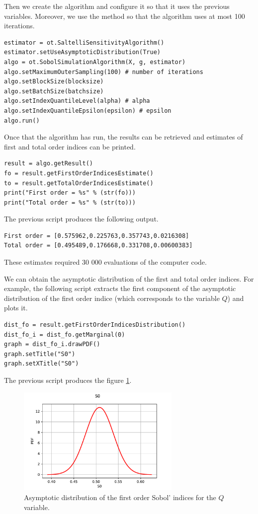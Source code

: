 \documentclass{uncecomp2019}
\begin{document}
Then we create the algorithm and configure it so that it 
uses the previous variables. 
Moreover, we use the  method so that 
the algorithm uses at most 100 iterations. 
\begin{lstlisting}
estimator = ot.SaltelliSensitivityAlgorithm()
estimator.setUseAsymptoticDistribution(True)
algo = ot.SobolSimulationAlgorithm(X, g, estimator)
algo.setMaximumOuterSampling(100) # number of iterations
algo.setBlockSize(blocksize) 
algo.setBatchSize(batchsize) 
algo.setIndexQuantileLevel(alpha) # alpha
algo.setIndexQuantileEpsilon(epsilon) # epsilon
algo.run()
\end{lstlisting}

Once that the algorithm has run, the results can be retrieved and estimates 
of first and total order indices can be printed. 
\begin{lstlisting}
result = algo.getResult()
fo = result.getFirstOrderIndicesEstimate()
to = result.getTotalOrderIndicesEstimate()
print("First order = %s" % (str(fo)))
print("Total order = %s" % (str(to)))
\end{lstlisting}

The previous script produces the following output.
\begin{lstlisting}
First order = [0.575962,0.225763,0.357743,0.0216308]
Total order = [0.495489,0.176668,0.331708,0.00600383]
\end{lstlisting}
These estimates required 30 000 evaluations of the computer code.

We can obtain the asymptotic distribution of the first and total 
order indices. 
For example, the following script extracts the first component of the 
asymptotic distribution of the first order indice (which corresponds to the variable 
$Q$) and plots it.
\begin{lstlisting}
dist_fo = result.getFirstOrderIndicesDistribution()
dist_fo_i = dist_fo.getMarginal(0)
graph = dist_fo_i.drawPDF()
graph.setTitle("S0")
graph.setXTitle("S0")
\end{lstlisting}
The previous script produces the figure \ref{fig:asymptQ}.

\begin{figure}[!ht]
\begin{center}
    \includegraphics[width=0.7\textwidth]{figures/S0-distribution} 
\end{center}
\caption{Asymptotic distribution of the first order Sobol' indices 
for the $Q$ variable.}
\label{fig:asymptQ}
\end{figure}
\end{document}

